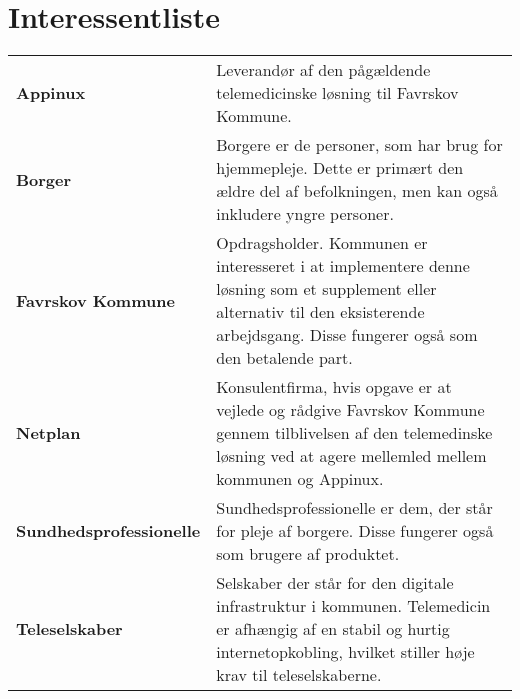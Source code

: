 \documentclass[10pt,a4paper]{article}
\begin{document}
\section{Interessentliste}

\begin{table}[H]
\begin{tabularx}{\linewidth}{lX}

\textbf{Appinux} & Leverandør af den pågældende telemedicinske løsning til Favrskov Kommune.\\

\textbf{Borger} & Borgere er de personer, som har brug for hjemmepleje. Dette er primært den ældre del af befolkningen, men kan også inkludere yngre personer. \\ 

\textbf{Favrskov Kommune} & Opdragsholder. Kommunen er interesseret i at implementere denne løsning som et supplement eller alternativ til den eksisterende arbejdsgang. Disse fungerer også som den betalende part.\\

\textbf{Netplan} & Konsulentfirma, hvis opgave er at vejlede og rådgive Favrskov Kommune gennem tilblivelsen af den telemedinske løsning ved at agere mellemled mellem kommunen og Appinux.\\

\textbf{Sundhedsprofessionelle} & Sundhedsprofessionelle er dem, der står for pleje af borgere. Disse fungerer også som brugere af produktet. \\

\textbf{Teleselskaber} & Selskaber der står for den digitale infrastruktur i kommunen. Telemedicin er afhængig af en stabil og hurtig internetopkobling, hvilket stiller høje krav til teleselskaberne.\\

\end{tabularx}
\end{table}
\end{document}

